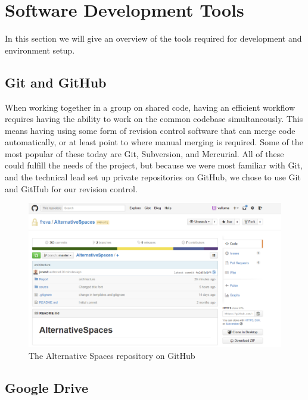 \section{Software Development Tools}
\label{sec:PlanningSoftwareDev}

In this section we will give an overview of the tools required for development and environment setup.

\subsection{Git and GitHub}
\label{subsec:PlanningSoftwareDevGit}

When working together in a group on shared code, having an efficient workflow requires having the ability to work on the common codebase simultaneously. This means having using some form of revision control software that can merge code automatically, or at least point to where manual merging is required. Some of the most popular of these today are Git, Subversion, and Mercurial. All of these could fulfill the needs of the project, but because we were most familiar with Git, and the technical lead set up private repositories on GitHub, we chose to use Git and GitHub for our revision control.

\begin{figure}[ht!]
  \centering
  \includegraphics[width=\linewidth]{./Planning/img/ASpacesRepo}
  \caption{The Alternative Spaces repository on GitHub}
  \label{fig:PlanningSoftwareDevGitRepo}
\end{figure}

\subsection{Google Drive}
\label{subsec:PlanningSoftwareDevDrive}

